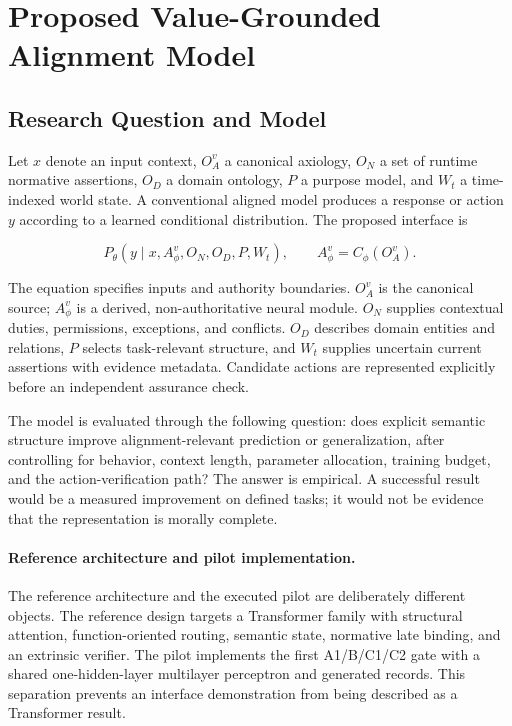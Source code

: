 \section{Proposed Value-Grounded Alignment Model}
\label{sec:problem}

\subsection{Research Question and Model}

Let $x$ denote an input context, $O_A^v$ a canonical axiology, $O_N$ a set of runtime normative assertions, $O_D$ a domain ontology, $P$ a purpose model, and $W_t$ a time-indexed world state. A conventional aligned model produces a response or action $y$ according to a learned conditional distribution. The proposed interface is

\begin{equation}
  P_\theta\!\left(y\mid x,A_\phi^v,O_N,O_D,P,W_t\right),
  \qquad A_\phi^v=C_\phi(O_A^v).
  \label{eq:vgta-interface}
\end{equation}

The equation specifies inputs and authority boundaries. $O_A^v$ is the canonical source; $A_\phi^v$ is a derived, non-authoritative neural module. $O_N$ supplies contextual duties, permissions, exceptions, and conflicts. $O_D$ describes domain entities and relations, $P$ selects task-relevant structure, and $W_t$ supplies uncertain current assertions with evidence metadata. Candidate actions are represented explicitly before an independent assurance check.

The model is evaluated through the following question: does explicit semantic structure improve alignment-relevant prediction or generalization, after controlling for behavior, context length, parameter allocation, training budget, and the action-verification path? The answer is empirical. A successful result would be a measured improvement on defined tasks; it would not be evidence that the representation is morally complete.

\paragraph{Reference architecture and pilot implementation.}

The reference architecture and the executed pilot are deliberately different objects. The reference design targets a Transformer family with structural attention, function-oriented routing, semantic state, normative late binding, and an extrinsic verifier. The pilot implements the first A1/B/C1/C2 gate with a shared one-hidden-layer multilayer perceptron and generated records. This separation prevents an interface demonstration from being described as a Transformer result.

